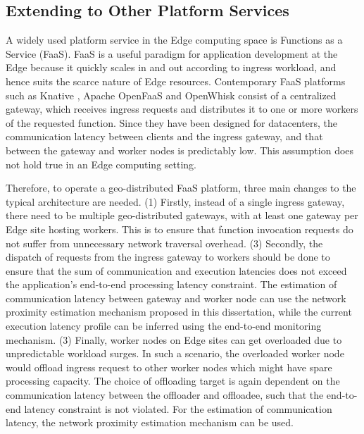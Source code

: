 \subsection{Extending to Other Platform Services}
A widely used platform service in the Edge computing space is Functions as a Service (FaaS). FaaS is a useful paradigm for application development at the Edge because it quickly scales in and out according to ingress workload, and hence suits the scarce nature of Edge resources. Contemporary FaaS platforms such as Knative \cite{knative}, Apache OpenFaaS \cite{openfaas} and OpenWhisk \cite{openwhisk} consist of a centralized gateway, which receives ingress requests and distributes it to one or more workers of the requested function. Since they have been designed for datacenters, the communication latency between clients and the ingress gateway, and that between the gateway and worker nodes is predictably low. This assumption does not hold true in an Edge computing setting.
\par Therefore, to operate a geo-distributed FaaS platform, three main changes to the typical architecture are needed. (1) Firstly, instead of a single ingress gateway, there need to be multiple geo-distributed gateways, with at least one gateway per Edge site hosting workers. This is to ensure that function invocation requests do not suffer from unnecessary network traversal overhead. (3) Secondly, the dispatch of requests from the ingress gateway to workers should be done to ensure that the sum of communication and execution latencies does not exceed the application's end-to-end processing latency constraint. The estimation of communication latency between gateway and worker node can use the network proximity estimation mechanism proposed in this dissertation, while the current execution latency profile can be inferred using the end-to-end monitoring mechanism. (3) Finally, worker nodes on Edge sites can get overloaded due to unpredictable workload surges. In such a scenario, the overloaded worker node would offload ingress request to other worker nodes which might have spare processing capacity. The choice of offloading target is again dependent on the communication latency between the offloader and offloadee, such that the end-to-end latency constraint is not violated. For the estimation of communication latency, the network  proximity estimation mechanism can be used.

